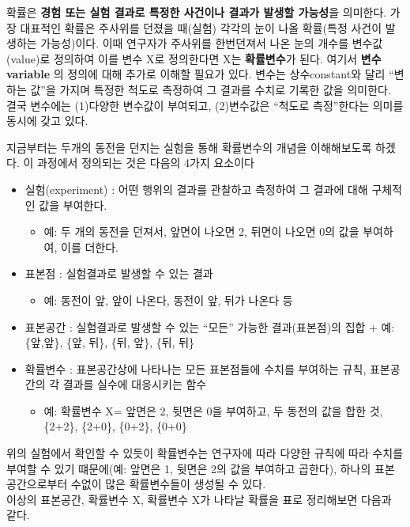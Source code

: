 \documentclass[
]{book}
\providecommand{\tightlist}{%
  \setlength{\itemsep}{0pt}\setlength{\parskip}{0pt}}
\begin{document}
확률은 \textbf{경험 또는 실험 결과로 특정한 사건이나 결과가 발생할 가능성}을 의미한다. 가장 대표적인 확률은 주사위를 던졌을 때(실험) 각각의 눈이 나올 확률(특정 사건이 발생하는 가능성)이다. 이때 연구자가 주사위를 한번던져서 나온 눈의 개수를 변수값(value)로 정의하여 이를 변수 X로 정의한다면 X는 \textbf{확률변수}가 된다. 여기서 \textbf{변수variable} 의 정의에 대해 추가로 이해할 필요가 있다. 변수는 상수constant와 달리 ``변하는 값''을 가지며 특정한 척도로 측정하여 그 결과를 수치로 기록한 값을 의미한다. 결국 변수에는 (1)다양한 변수값이 부여되고, (2)변수값은 ``척도로 측정''한다는 의미를 동시에 갖고 있다.

지금부터는 두개의 동전을 던지는 실험을 통해 확률변수의 개념을 이해해보도록 하겠다. 이 과정에서 정의되는 것은 다음의 4가지 요소이다

\begin{itemize}
\tightlist
\item
  실험(experiment) : 어떤 행위의 결과를 관찰하고 측정하여 그 결과에 대해 구체적인 값을 부여한다.

  \begin{itemize}
  \tightlist
  \item
    예: 두 개의 동전을 던져서, 앞면이 나오면 2, 뒤면이 나오면 0의 값을 부여하여, 이를 더한다.
  \end{itemize}
\item
  표본점 : 실험결과로 발생할 수 있는 결과

  \begin{itemize}
  \tightlist
  \item
    예: 동전이 앞, 앞이 나온다, 동전이 앞, 뒤가 나온다 등
  \end{itemize}
\item
  표본공간 : 실험결과로 발생할 수 있는 ``모든'' 가능한 결과(표본점)의 집합
  + 예: \{앞,앞\}, \{앞, 뒤\}, \{뒤, 앞\}, \{뒤, 뒤\}
\item
  확률변수 : 표본공간상에 나타나는 모든 표본점들에 수치를 부여하는 규칙, 표본공간의 각 결과를 실수에 대응시키는 함수

  \begin{itemize}
  \tightlist
  \item
    예: 확률변수 X= 앞면은 2, 뒷면은 0을 부여하고, 두 동전의 값을 합한 것, \{2+2\}, \{2+0\}, \{0+2\}, \{0+0\}
  \end{itemize}
\end{itemize}

위의 실험에서 확인할 수 있듯이 확률변수는 연구자에 따라 다양한 규칙에 따라 수치를 부여할 수 있기 떄문에(예: 앞면은 1, 뒷면은 2의 값을 부여하고 곱한다), 하나의 표본공간으로부터 수없이 많은 확률변수들이 생성될 수 있다.\\
이상의 표본공간, 확률변수 X, 확률변수 X가 나타날 확률을 표로 정리해보면 다음과 같다.
\end{document}
